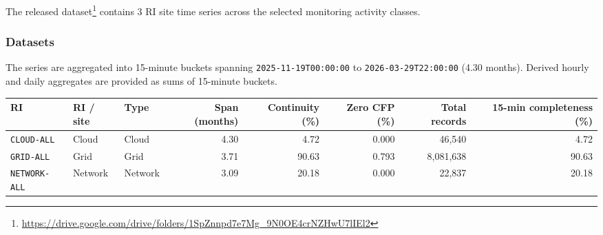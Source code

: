 The released dataset\footnote{\url{https://drive.google.com/drive/folders/1SpZnnpd7e7Mg_9N0OE4crNZHwU7lIEl2}} contains 3 RI site time series across the selected monitoring activity classes.

\subsubsection*{Datasets}
The series are aggregated into 15-minute buckets spanning
\texttt{2025-11-19T00:00:00} to \texttt{2026-03-29T22:00:00} (4.30 months). Derived hourly and daily aggregates are provided as sums of 15-minute buckets.
\begin{table}[h]
\centering
\begin{tabular}{l l l r r r r r}
\hline
RI & RI / site & Type & Span (months) & Continuity (\%) & Zero CFP (\%) & Total records & 15-min completeness (\%) \\
\hline
\texttt{CLOUD-ALL} & Cloud & Cloud & 4.30 & 4.72 & 0.000 & 46,540 & 4.72 \\
\texttt{GRID-ALL} & Grid & Grid & 3.71 & 90.63 & 0.793 & 8,081,638 & 90.63 \\
\texttt{NETWORK-ALL} & Network & Network & 3.09 & 20.18 & 0.000 & 22,837 & 20.18 \\
\hline
\end{tabular}
\end{table}
